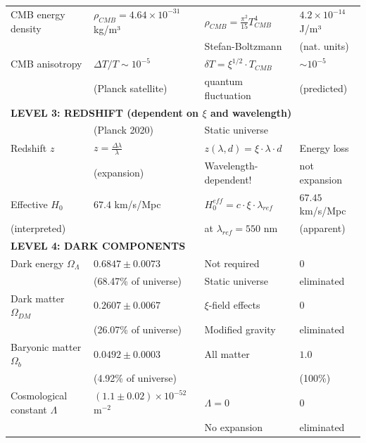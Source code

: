 \begin{longtable}{p{4.0cm}p{3.2cm}p{2.8cm}p{2.8cm}}
	CMB energy density & $\rho_{CMB} = 4.64 \times 10^{-31}$ kg/m³ & $\rho_{CMB} = \frac{\pi^2}{15} T_{CMB}^4$ & $4.2 \times 10^{-14}$ J/m³ \\
	& & Stefan-Boltzmann & (nat. units) \\[0.3em]
	
	CMB anisotropy & $\Delta T/T \sim 10^{-5}$ & $\delta T = \xi^{1/2} \cdot T_{CMB}$ & $\sim 10^{-5}$ \\
	& (Planck satellite) & quantum fluctuation & (predicted) \\[0.3em]
	
	\midrule
	\multicolumn{4}{l}{\textbf{LEVEL 3: REDSHIFT (dependent on $\xi$ and wavelength)}} \\
	\midrule
	
	& (Planck 2020) & Static universe & \\[0.3em]
	
	Redshift $z$ & $z = \frac{\Delta\lambda}{\lambda}$ & $z(\lambda, d) = \xi \cdot \lambda \cdot d$ & Energy loss \\
	& (expansion) & Wavelength-dependent! & not expansion \\[0.3em]
	
	Effective $H_0$ & $67.4$ km/s/Mpc & $H_0^{eff} = c \cdot \xi \cdot \lambda_{ref}$ & $67.45$ km/s/Mpc \\
	(interpreted) & & at $\lambda_{ref} = 550$ nm & (apparent) \\[0.3em]
	
	\midrule
	\multicolumn{4}{l}{\textbf{LEVEL 4: DARK COMPONENTS}} \\
	\midrule
	
	Dark energy $\Omega_\Lambda$ & $0.6847 \pm 0.0073$ & Not required & $0$ \\
	& (68.47\% of universe) & Static universe & eliminated \\[0.3em]
	
	Dark matter $\Omega_{DM}$ & $0.2607 \pm 0.0067$ & $\xi$-field effects & $0$ \\
	& (26.07\% of universe) & Modified gravity & eliminated \\[0.3em]
	
	Baryonic matter $\Omega_b$ & $0.0492 \pm 0.0003$ & All matter & $1.0$ \\
	& (4.92\% of universe) & & (100\%) \\[0.3em]
	
	Cosmological constant $\Lambda$ & $(1.1 \pm 0.02) \times 10^{-52}$ m$^{-2}$ & $\Lambda = 0$ & $0$ \\
	& & No expansion & eliminated \\[0.3em]
	

\end{longtable}
